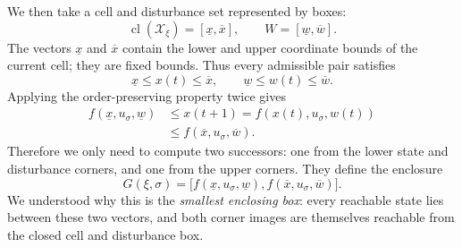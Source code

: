 \documentclass[11pt,a4paper]{article}
\begin{document}
We then take a cell and disturbance set represented by boxes:
\[
 \operatorname{cl}(\mathcal X_\xi)=[\underline x,\overline x],
 \qquad W=[\underline w,\overline w].
\]
The vectors $\underline x$ and $\overline x$ contain the lower and upper
coordinate bounds of the current cell; they are fixed bounds. Thus every admissible pair satisfies
\[
 \underline x\le x(t)\le\overline x,\qquad
 \underline w\le w(t)\le\overline w.
\]
Applying the order-preserving property twice gives
\[
 \begin{aligned}
 f(\underline x,u_\sigma,\underline w)
 &\le x(t+1)=f(x(t),u_\sigma,w(t))\\
 &\le f(\overline x,u_\sigma,\overline w).
 \end{aligned}
\]
Therefore we only need to compute two successors: one from the lower
state and disturbance corners, and one from the upper corners. They
define the enclosure
\[
 G(\xi,\sigma)=
 \big[f(\underline x,u_\sigma,\underline w),
      f(\overline x,u_\sigma,\overline w)\big].
\]
We understood why this is the \emph{smallest enclosing box}: every
reachable state lies between these two vectors, and both corner images
are themselves reachable from the closed cell and disturbance box.
\end{document}
